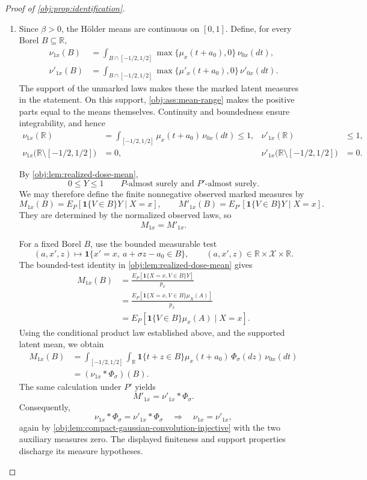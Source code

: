 \begin{proof}[Proof of \cref{obj:prop:identification}]
\begin{enumerate}
\item Since \(\beta>0\), the Hölder means are continuous on \([0,1]\). Define, for every Borel \(B\subseteq\mathbb R\),
\[
\begin{aligned}
\nu_{1x}(B)
&=\int_{B\cap[-1/2,1/2]}
\max\{\mu_x(t+a_0),0\}\,\nu_{0x}(dt),\\
\nu'_{1x}(B)
&=\int_{B\cap[-1/2,1/2]}
\max\{\mu'_x(t+a_0),0\}\,\nu'_{0x}(dt).
\end{aligned}
\]
The support of the unmarked laws makes these the marked latent measures in the statement. On this support, \cref{obj:ass:mean-range} makes the positive parts equal to the means themselves. Continuity and boundedness ensure integrability, and hence
\[
\begin{aligned}
\nu_{1x}(\mathbb R)
&=\int_{[-1/2,1/2]}\mu_x(t+a_0)\,\nu_{0x}(dt)\le1,
&
\nu'_{1x}(\mathbb R)&\le1,\\
\nu_{1x}\bigl(\mathbb R\setminus[-1/2,1/2]\bigr)
&=0,
&
\nu'_{1x}\bigl(\mathbb R\setminus[-1/2,1/2]\bigr)&=0.
\end{aligned}
\]

By \cref{obj:lem:realized-dose-mean},
\[
0\le Y\le1
\qquad P\text{-almost surely and }P'\text{-almost surely}.
\]
We may therefore define the finite nonnegative observed marked measures by
\[
M_{1x}(B)=E_P[\mathbf1\{V\in B\}Y\mid X=x],
\qquad
M'_{1x}(B)=E_{P'}[\mathbf1\{V\in B\}Y\mid X=x].
\]
They are determined by the normalized observed laws, so
\[
M_{1x}=M'_{1x}.
\]

For a fixed Borel \(B\), use the bounded measurable test
\[
(a,x',z)\longmapsto
\mathbf1\{x'=x,\ a+\sigma z-a_0\in B\},
\qquad
(a,x',z)\in\mathbb R\times\mathcal X\times\mathbb R.
\]
The bounded-test identity in \cref{obj:lem:realized-dose-mean} gives
\[
\begin{aligned}
M_{1x}(B)
&=\frac{E_P[\mathbf1\{X=x,V\in B\}Y]}{p_x}\\
&=\frac{E_P[\mathbf1\{X=x,V\in B\}\mu_X(A)]}{p_x}\\
&=E_P[\mathbf1\{V\in B\}\mu_x(A)\mid X=x].
\end{aligned}
\]
Using the conditional product law established above, and the supported latent mean, we obtain
\[
\begin{aligned}
M_{1x}(B)
&=\int_{[-1/2,1/2]}\int_{\mathbb R}
\mathbf1\{t+z\in B\}\mu_x(t+a_0)\,
\Phi_\sigma(dz)\,\nu_{0x}(dt)\\
&=(\nu_{1x}*\Phi_\sigma)(B).
\end{aligned}
\]
The same calculation under \(P'\) yields
\[
M'_{1x}=\nu'_{1x}*\Phi_\sigma.
\]
Consequently,
\[
\nu_{1x}*\Phi_\sigma=\nu'_{1x}*\Phi_\sigma
\quad\Longrightarrow\quad
\nu_{1x}=\nu'_{1x},
\]
again by \cref{obj:lem:compact-gaussian-convolution-injective} with the two auxiliary measures zero. The displayed finiteness and support properties discharge its measure hypotheses.


\end{enumerate}
\end{proof}
